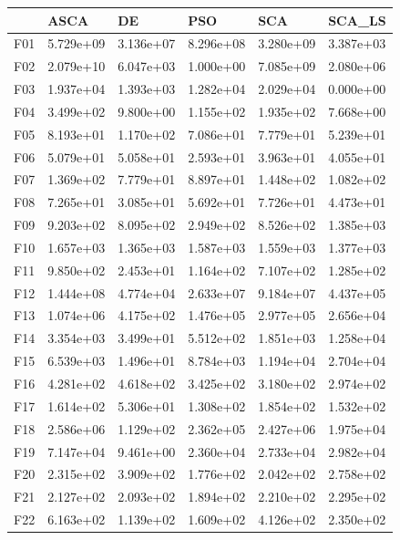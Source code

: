 \begin{tabular}{llllll}
\toprule
{} &       ASCA &         DE &        PSO &        SCA &     SCA\_LS \\
\midrule
F01  &  5.729e+09 &  3.136e+07 &  8.296e+08 &  3.280e+09 &  3.387e+03 \\
F02  &  2.079e+10 &  6.047e+03 &  1.000e+00 &  7.085e+09 &  2.080e+06 \\
F03  &  1.937e+04 &  1.393e+03 &  1.282e+04 &  2.029e+04 &  0.000e+00 \\
F04  &  3.499e+02 &  9.800e+00 &  1.155e+02 &  1.935e+02 &  7.668e+00 \\
F05  &  8.193e+01 &  1.170e+02 &  7.086e+01 &  7.779e+01 &  5.239e+01 \\
F06  &  5.079e+01 &  5.058e+01 &  2.593e+01 &  3.963e+01 &  4.055e+01 \\
F07  &  1.369e+02 &  7.779e+01 &  8.897e+01 &  1.448e+02 &  1.082e+02 \\
F08  &  7.265e+01 &  3.085e+01 &  5.692e+01 &  7.726e+01 &  4.473e+01 \\
F09  &  9.203e+02 &  8.095e+02 &  2.949e+02 &  8.526e+02 &  1.385e+03 \\
F10  &  1.657e+03 &  1.365e+03 &  1.587e+03 &  1.559e+03 &  1.377e+03 \\
F11  &  9.850e+02 &  2.453e+01 &  1.164e+02 &  7.107e+02 &  1.285e+02 \\
F12  &  1.444e+08 &  4.774e+04 &  2.633e+07 &  9.184e+07 &  4.437e+05 \\
F13  &  1.074e+06 &  4.175e+02 &  1.476e+05 &  2.977e+05 &  2.656e+04 \\
F14  &  3.354e+03 &  3.499e+01 &  5.512e+02 &  1.851e+03 &  1.258e+04 \\
F15  &  6.539e+03 &  1.496e+01 &  8.784e+03 &  1.194e+04 &  2.704e+04 \\
F16  &  4.281e+02 &  4.618e+02 &  3.425e+02 &  3.180e+02 &  2.974e+02 \\
F17  &  1.614e+02 &  5.306e+01 &  1.308e+02 &  1.854e+02 &  1.532e+02 \\
F18  &  2.586e+06 &  1.129e+02 &  2.362e+05 &  2.427e+06 &  1.975e+04 \\
F19  &  7.147e+04 &  9.461e+00 &  2.360e+04 &  2.733e+04 &  2.982e+04 \\
F20  &  2.315e+02 &  3.909e+02 &  1.776e+02 &  2.042e+02 &  2.758e+02 \\
F21  &  2.127e+02 &  2.093e+02 &  1.894e+02 &  2.210e+02 &  2.295e+02 \\
F22  &  6.163e+02 &  1.139e+02 &  1.609e+02 &  4.126e+02 &  2.350e+02 \\

\end{tabular}
